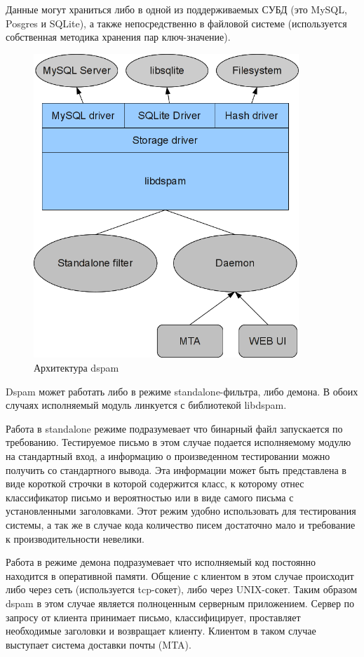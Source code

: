 Данные могут храниться либо в одной из поддерживаемых СУБД (это MySQL, Posgres и SQLite), а также непосредственно в файловой системе (используется собственная методика хранения пар ключ-значение).

\begin{figure}[h]
\begin{center}
\includegraphics[width=10cm]{img/dspamarch}
\end{center}
\caption{Архитектура dspam}
\label{dspamarch}
\end{figure}

Dspam может работать либо в режиме standalone-фильтра, либо демона. В обоих случаях
исполняемый модуль линкуется с библиотекой libdspam.

Работа в standalone режиме подразумевает что бинарный файл запускается по требованию. Тестируемое письмо в этом случае подается исполняемому модулю на стандартный вход, а информацию о произведенном тестировании можно
получить со стандартного вывода. Эта информации может быть представлена в виде короткой строчки в которой содержится класс, к которому отнес классификатор письмо и вероятностью или в виде самого письма с установленными заголовками. Этот режим удобно использовать для тестирования системы, а так же в случае кода количество писем достаточно мало и требование к производительности невелики.

Работа в режиме демона подразумевает что исполняемый код постоянно находится в оперативной памяти. Общение с клиентом в этом случае происходит либо через сеть (используется tcp-сокет), либо через UNIX-сокет. Таким образом dspam в этом случае является полноценным серверным приложением. Сервер по запросу от клиента принимает письмо, классифицирует, проставляет необходимые заголовки и возвращает клиенту. Клиентом в таком случае выступает система доставки почты (MTA).

